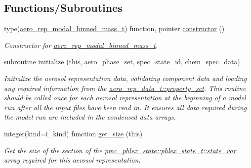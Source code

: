 \subsection*{Functions/\+Subroutines}
\begin{DoxyCompactItemize}
\item 
type(\mbox{\hyperlink{structpmc__aero__rep__modal__binned__mass_1_1aero__rep__modal__binned__mass__t}{aero\+\_\+rep\+\_\+modal\+\_\+binned\+\_\+mass\+\_\+t}}) function, pointer \mbox{\hyperlink{namespacepmc__aero__rep__modal__binned__mass_a45a135fa387108e2a7ac3664186f3a09}{constructor}} ()
\begin{DoxyCompactList}\small\item\em Constructor for \mbox{\hyperlink{structpmc__aero__rep__modal__binned__mass_1_1aero__rep__modal__binned__mass__t}{aero\+\_\+rep\+\_\+modal\+\_\+binned\+\_\+mass\+\_\+t}}. \end{DoxyCompactList}\item 
subroutine \mbox{\hyperlink{namespacepmc__aero__rep__modal__binned__mass_ab5b93faae1796c83780773a5475adeed}{initialize}} (this, aero\+\_\+phase\+\_\+set, \mbox{\hyperlink{interfacepmc__aero__rep__data_1_1spec__state__id}{spec\+\_\+state\+\_\+id}}, chem\+\_\+spec\+\_\+data)
\begin{DoxyCompactList}\small\item\em Initialize the aerosol representation data, validating component data and loading any required information from the {\ttfamily \mbox{\hyperlink{structpmc__aero__rep__data_1_1aero__rep__data__t_a87b1bf5cd10a0a2b51390fb24ebf56c5}{aero\+\_\+rep\+\_\+data\+\_\+t\+::property\+\_\+set}}}. This routine should be called once for each aerosol representation at the beginning of a model run after all the input files have been read in. It ensures all data required during the model run are included in the condensed data arrays. \end{DoxyCompactList}\item 
integer(kind=i\+\_\+kind) function \mbox{\hyperlink{namespacepmc__aero__rep__modal__binned__mass_a2d6f17a8b9f3c6748a16f97d034bc9d1}{get\+\_\+size}} (this)
\begin{DoxyCompactList}\small\item\em Get the size of the section of the {\ttfamily \mbox{\hyperlink{structpmc__phlex__state_1_1phlex__state__t_a78835cb552d483ebbfc7a6bc6f756918}{pmc\+\_\+phlex\+\_\+state\+::phlex\+\_\+state\+\_\+t\+::state\+\_\+var}}} array required for this aerosol representation. \end{DoxyCompactList}\item 

\end{DoxyCompactItemize}
